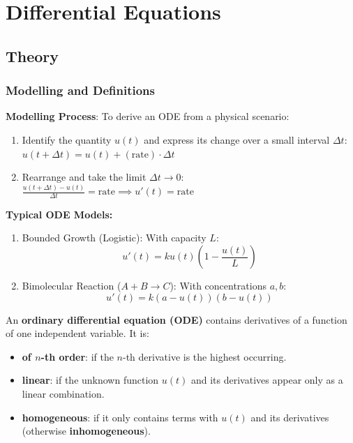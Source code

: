 \section{Differential Equations}

\subsection{Theory}

\subsubsection{Modelling and Definitions}

\begin{remark}
    \textbf{Modelling Process}: To derive an ODE from a physical scenario:
    \begin{enumerate}
        \item Identify the quantity $u(t)$ and express its change over a small interval $\Delta t$:
        $u(t+\Delta t) = u(t) + (\text{rate}) \cdot \Delta t$
        \item Rearrange and take the limit $\Delta t \to 0$:
        $\frac{u(t+\Delta t) - u(t)}{\Delta t} = \text{rate} \implies u'(t) = \text{rate}$
    \end{enumerate}
\end{remark}

\begin{remark}
    \textbf{Typical ODE Models:}
    \begin{enumerate}
        \item Bounded Growth (Logistic): With capacity $L$:
        $$u'(t) = k u(t) \left(1 - \frac{u(t)}{L}\right)$$
        \item Bimolecular Reaction ($A + B \to C$): With concentrations $a, b$:
        $$u'(t) = k(a - u(t))(b - u(t))$$
    \end{enumerate}
\end{remark}

\begin{definition}
    An \textbf{ordinary differential equation (ODE)} contains derivatives of a function of one independent variable. It is:
    \begin{itemize}
        \item \textbf{of $n$-th order}: if the $n$-th derivative is the highest occurring.
        \item \textbf{linear}: if the unknown function $u(t)$ and its derivatives appear only as a linear combination.
        \item \textbf{homogeneous}: if it only contains terms with $u(t)$ and its derivatives (otherwise \textbf{inhomogeneous}).
    \end{itemize}
\end{definition}

